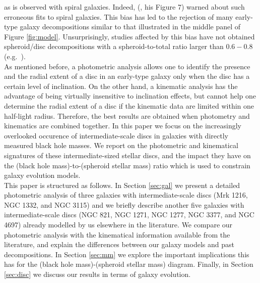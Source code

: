 \documentclass[useAMS,usenatbib,article]{mnras}
\begin{document}
{as is observed with spiral galaxies. 
Indeed, \citeauthor{graham2011} (\citeyear{graham2011}, his Figure 7) warned about such erroneous fits to spiral galaxies. 
This bias has led to the rejection of many early-type galaxy decompositions similar to that illustrated in the middle panel of Figure \ref{fig:model}. 
Unsurprisingly, studies affected by this bias have not obtained spheroid/disc decompositions with a spheroid-to-total ratio larger than $0.6 - 0.8$ 
(e.g.~\citealt{gadotti2008,head2014,querejeta2015,mendezabreu2015}). \\
As mentioned before, a photometric analysis allows one to identify the presence and the radial extent of a disc in an early-type galaxy 
only when the disc has a certain level of inclination. 
On the other hand, a kinematic analysis has the advantage of being virtually insensitive to inclination effects, 
but cannot help one determine the radial extent of a disc if the kinematic data are limited within one half-light radius. 
Therefore, the best results are obtained when photometry and kinematics are combined together. 
In this paper we focus on the increasingly overlooked occurence of intermediate-scale discs in galaxies with directly measured black hole masses. 
We report on the photometric and kinematical signatures of these intermediate-sized stellar discs,  
and the impact they have on the (black hole mass)-to-(spheroid stellar mass) ratio 
which is used to constrain galaxy evolution models. \\
This paper is structured as follows. 
In Section \ref{sec:gal} we present a detailed photometric analysis of three galaxies with intermediate-scale discs (Mrk 1216, NGC 1332, and NGC 3115) 
and we briefly describe another five galaxies with intermediate-scale discs (NGC 821, NGC 1271, NGC 1277, NGC 3377, and NGC 4697) 
already modelled by us elsewhere in the literature. 
We compare our photometric analysis with the kinematical information available from the literature, 
and explain the differences between our galaxy models and past decompositions. 
In Section \ref{sec:mm} we explore the important implications this has for the (black hole mass)-(spheroid stellar mass) diagram. 
Finally, in Section \ref{sec:disc} we discuss our results in terms of galaxy evolution. }
\end{document}
